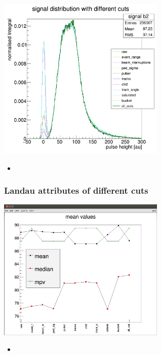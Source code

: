 \documentclass[9pt]{beamer}
\begin{document}
\begin{frame}
	\begin{center}
		\includegraphics[width=8cm]{Pics/normalised}
	\end{center}
	\begin{itemize}
		\item 
	\end{itemize}
\end{frame}
\begin{frame}
	\frametitle{Landau attributes of different cuts}
	\begin{center}
		\includegraphics[width=8cm]{Pics/landaucuts}
	\end{center}
	\begin{itemize}
		\item 
	\end{itemize}
\end{frame}
\end{document}
